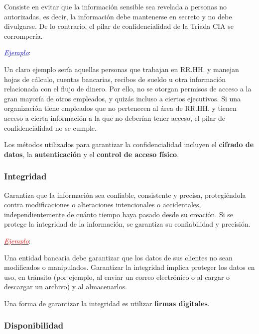 \documentclass[a4paper]{article} %
\begin{document}
        Consiste en evitar que la información sensible sea revelada a personas no autorizadas, es decir, la información debe mantenerse en secreto y no debe divulgarse. De lo contrario, el pilar de confidencialidad de la Triada CIA se corrompería.

        \underline{\textit{\textcolor{blue}{Ejemplo}}}:
        
        Un claro ejemplo sería aquellas personas que trabajan en RR.HH. y manejan hojas de cálculo, cuentas bancarias, recibos de sueldo u otra información relacionada con el flujo de dinero. Por ello, no se otorgan permisos de acceso a la gran mayoría de otros empleados, y quizás incluso a ciertos ejecutivos. Si una organización tiene empleados que no pertenecen al área de RR.HH. y tienen acceso a cierta información a la que no deberían tener acceso, el pilar de confidencialidad no se cumple.

        Los métodos utilizados para garantizar la confidencialidad incluyen el \textbf{cifrado de datos}, la \textbf{autenticación} y el \textbf{control de acceso físico}.
        
        \vspace{2cm}

        \subsubsection{Integridad}

        Garantiza que la información sea confiable, consistente y precisa, protegiéndola contra modificaciones o alteraciones intencionales o accidentales, independientemente de cuánto tiempo haya pasado desde su creación. Si se protege la integridad de la información, se garantiza su confiabilidad y precisión.

        \underline{\textit{\textcolor{red}{Ejemplo}}}: 

        Una entidad bancaria debe garantizar que los datos de sus clientes no sean modificados o manipulados. Garantizar la integridad implica proteger los datos en uso, en tránsito (por ejemplo, al enviar un correo electrónico o al cargar o descargar un archivo) y al almacenarlos.
        
        Una forma de garantizar la integridad es utilizar \textbf{firmas digitales}.

        \subsubsection{Disponibilidad}
\end{document}
